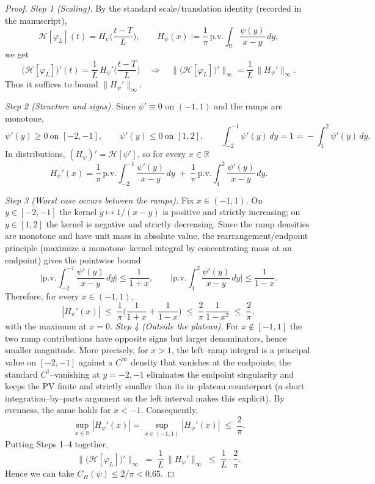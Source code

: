 \documentclass[11pt]{article}
\theoremstyle{definition}
\theoremstyle{remark}
\begin{document}
\begin{proof}
\textit{Step 1 (Scaling).} By the standard scale/translation identity (recorded in the manuscript),
\[
  \mathcal H[\varphi_L](t)=H_\psi\!\Big(\frac{t-T}{L}\Big),\qquad
  H_\psi(x):=\frac{1}{\pi}\,\mathrm{p.v.}\!\int_{\mathbb R}\frac{\psi(y)}{x-y}\,dy,
\]
we get
\[
  \big(\mathcal H[\varphi_L]\big)'(t)=\frac{1}{L}\,H_\psi'\!\Big(\frac{t-T}{L}\Big)
  \quad\Longrightarrow\quad
  \big\|\big(\mathcal H[\varphi_L]\big)'\big\|_\infty=\frac{1}{L}\,\|H_\psi'\|_\infty.
\]
Thus it suffices to bound $\|H_\psi'\|_\infty$.

\smallskip
\textit{Step 2 (Structure and signs).} Since $\psi'\equiv0$ on $(-1,1)$ and the ramps are monotone,
\[
  \psi'(y)\ge0\ \text{on }[-2,-1],\qquad \psi'(y)\le0\ \text{on }[1,2],\qquad
  \int_{-2}^{-1}\psi'(y)\,dy=1=\!-\!\int_{1}^{2}\psi'(y)\,dy.
\]
In distributions, $(H_\psi)'= \mathcal H[\psi']$, so for every $x\in\mathbb R$
\[
  H_\psi'(x)=\frac{1}{\pi}\,\mathrm{p.v.}\!\int_{-2}^{-1}\frac{\psi'(y)}{x-y}\,dy\;+\;
             \frac{1}{\pi}\,\mathrm{p.v.}\!\int_{1}^{2}\frac{\psi'(y)}{x-y}\,dy.
\]

\smallskip
\textit{Step 3 (Worst case occurs between the ramps).} Fix $x\in(-1,1)$.  On $y\in[-2,-1]$ the kernel $y\mapsto 1/(x-y)$ is positive and strictly increasing; on $y\in[1,2]$ the kernel is negative and strictly decreasing.  Since the ramp densities are monotone and have unit mass in absolute value, the rearrangement/endpoint principle (maximize a monotone–kernel integral by concentrating mass at an endpoint) gives the pointwise bound
\[
  \Big|\mathrm{p.v.}\!\int_{-2}^{-1}\frac{\psi'(y)}{x-y}\,dy\Big|
  \le \frac{1}{1+x},\qquad
  \Big|\mathrm{p.v.}\!\int_{1}^{2}\frac{\psi'(y)}{x-y}\,dy\Big|
  \le \frac{1}{1-x}.
\]
Therefore, for every $x\in(-1,1)$,
\[
  |H_\psi'(x)| \;\le\; \frac{1}{\pi}\Big(\frac{1}{1+x}+\frac{1}{1-x}\Big)
  \;\le\; \frac{2}{\pi}\,\frac{1}{1-x^2}
  \;\le\; \frac{2}{\pi},
\]
with the maximum at $x=0$.
\smallskip
\textit{Step 4 (Outside the plateau).} For $x\notin[-1,1]$ the two ramp contributions have opposite signs but larger denominators, hence smaller magnitude. More precisely, for $x>1$, the left–ramp integral is a principal value on $[-2,-1]$ against a $C^\infty$ density that vanishes at the endpoints; the standard $C^1$–vanishing at $y=-2,-1$ eliminates the endpoint singularity and keeps the PV finite and strictly smaller than its in–plateau counterpart (a short integration–by–parts argument on the left interval makes this explicit). By evenness, the same holds for $x<-1$.  Consequently,
\[
  \sup_{x\in\mathbb R}|H_\psi'(x)|=\sup_{x\in(-1,1)}|H_\psi'(x)|\;\le\;\frac{2}{\pi}.
\]
Putting Steps 1–4 together,
\[
  \big\|\big(\mathcal H[\varphi_L]\big)'\big\|_\infty
  \;=\;\frac{1}{L}\,\|H_\psi'\|_\infty
  \;\le\;\frac{1}{L}\cdot\frac{2}{\pi}.
\]
Hence we can take $C_H(\psi)\le 2/\pi < 0.65$.
\end{proof}
\end{document}
